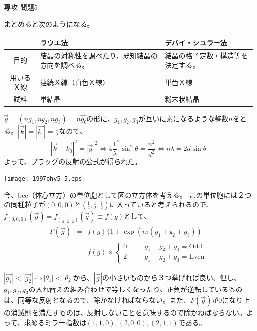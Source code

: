 \documentclass[fleqn]{jbook}
\begin{document}
\begin{answer}{専攻 問題5}{}
\begin{subanswers}

\SubAnswer  
まとめると次のようになる。
 
\begin{tabular}{|c||p{5cm}|p{5cm}|} \hline
    & ラウエ法 & デバイ・シュラー法 \\ \hline\hline
目的& 結晶の対称性を調べたり、既知結晶の方向を調べる。& 結晶の格子定数・構造等を決定する。\\ \hline
用いるＸ線  & 連続Ｘ線（白色Ｘ線） & 単色Ｘ線 \\ \hline
試料 & 単結晶 & 粉末状結晶  \\ \hline
\end{tabular}

\SubAnswer
\parbox[t]{100mm}{
$\Vec{g}=(ng_1,ng_2,ng_3)=n\Vec{g_0}$の形に、$g_1,g_2,g_3$が互いに素になるような整数$n$をとる。$|\Vec{k}|=|\Vec{k_0}|=\frac{1}{\lambda}$なので、
\[ |\Vec{k}-\Vec{k_0}|^2=|\Vec{g}|^2 \Longleftrightarrow 4\frac{1}{\lambda}^2 \sin^2\theta =\frac{n^2}{d^2} \Longleftrightarrow n\lambda =2d\sin\theta \]
よって、ブラッグの反射の公式が得られた。}\parbox[t]{60mm}{\vspace*{-10mm}
\begin{center}
\texttt{[image: 1997phy5-5.eps]}
\end{center}
}

\SubAnswer
今、bcc（体心立方）の単位胞として図の立方体を考える。 この単位胞には２つの同種粒子が$(0,0,0)$と$(\frac{1}{2},\frac{1}{2},\frac{1}{2})$に入っていると考えられるので、$f_{(0,0,0)}(\Vec{g})=f_{(\frac{1}{2},\frac{1}{2},\frac{1}{2})}(\Vec{g}) \equiv f(g)$として、
\begin{eqnarray*} 
F(\Vec{g})& = & f(g)\{1+\exp(i\pi(g_1+g_2+g_3)) \\
    & = & f(g)\times
\left\{ \begin{array}{ccl}
0 & \quad & g_1+g_2+g_3={\mbox{Odd}} \\
2 & \quad & g_1+g_2+g_3={\mbox{Even}} 
\end{array}\right.
\end{eqnarray*}

$|\Vec{g_1}|<|\Vec{g_2}| \Longleftrightarrow |\theta_1|<|\theta_2|$から、$|\Vec{g}|$の小さいものから３つ挙げれば良い。但し、$g_1,g_2,g_3$の入れ替えの組み合わせで等しくなったり、正負が逆転しているものは、同等な反射となるので、除かなければならない。また、$F(\Vec{g})$が$0$になり上の消滅則を満たすものは、反射しないことを意味するので除かねばならない。よって、求めるミラー指数は$(1,1,0),(2,0,0),(2,1,1)$である。


\end{subanswers}
\end{answer}
\end{document}
